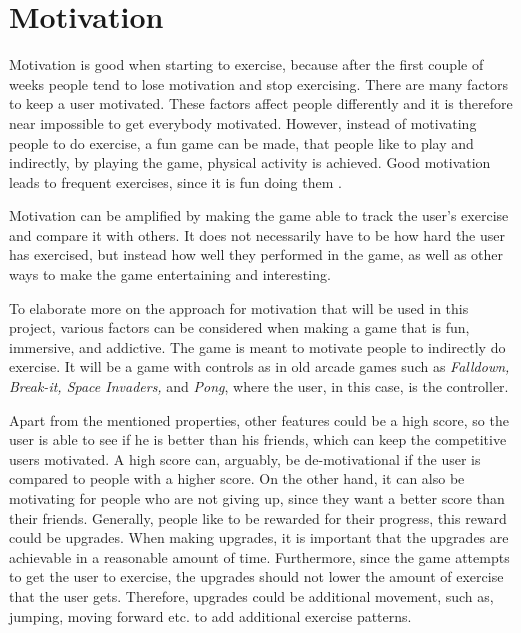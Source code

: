 \section{Motivation}\label{section:motivation}
Motivation is good when starting to exercise, because after the first couple of weeks people tend to lose motivation and stop exercising. 
There are many factors to keep a user motivated.
These factors affect people differently and it is therefore near impossible to get everybody motivated. 
However, instead of motivating people to do exercise, a fun game can be made, that people like to play and indirectly, by playing the game, physical activity is achieved.
Good motivation leads to frequent exercises, since it is fun doing them \citep{misc:gamemotivations}.

Motivation can be amplified by making the game able to track the user's exercise and compare it with others.
It does not necessarily have to be how hard the user has exercised, but instead how well they performed in the game, as well as other ways to make the game entertaining and interesting.

To elaborate more on the approach for motivation that will be used in this project, various factors can be considered when making a game that is fun, immersive, and addictive.
The game is meant to motivate people to indirectly do exercise.
It will be a game with controls as in old arcade games such as \textit{Falldown, Break-it, Space Invaders,} and \textit{Pong}, where the user, in this case, is the controller.

Apart from the mentioned properties, other features could be a high score, so the user is able to see if he is better than his friends, which can keep the competitive users motivated.
A high score can, arguably, be de-motivational if the user is compared to people with a higher score.
On the other hand, it can also be motivating for people who are not giving up, since they want a better score than their friends.
Generally, people like to be rewarded for their progress, this reward could be upgrades.
When making upgrades, it is important that the upgrades are achievable in a reasonable amount of time.
Furthermore, since the game attempts to get the user to exercise, the upgrades should not lower the amount of exercise that the user gets.
Therefore, upgrades could be additional movement, such as, jumping, moving forward etc. to add additional exercise patterns.





